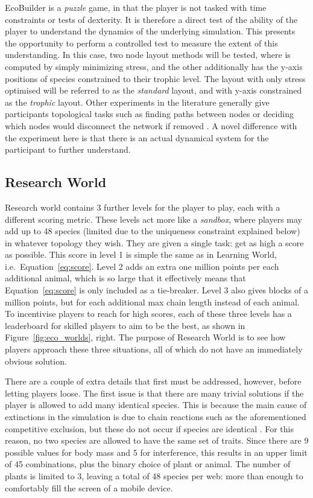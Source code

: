 EcoBuilder is a \emph{puzzle} game, in that the player is not tasked with time constraints or tests of dexterity. It is therefore a direct test of the ability of the player to understand the dynamics of the underlying simulation.
This presents the opportunity to perform a controlled test to measure the extent of this understanding. In this case, two node layout methods will be tested, where is computed by simply minimizing stress, and the other additionally has the y-axis positions of species constrained to their trophic level. The layout with only stress optimised will be referred to as the \emph{standard} layout, and with y-axis constrained as the \emph{trophic} layout.
Other experiments in the literature generally give participants topological tasks such as finding paths between nodes \cite{Bach2017, Okoe2018} or deciding which nodes would disconnect the network if removed \cite{Purchase1997}. A novel difference with the experiment here is that there is an actual dynamical system for the participant to further understand.

\subsection{Research World}
\label{sec:research_world}
Research world contains 3 further levels for the player to play, each with a different scoring metric. These levels act more like a \emph{sandbox}, where players may add up to 48 species (limited due to the uniqueness constraint explained below) in whatever topology they wish.
They are given a single task: get as high a score as possible. This score in level 1 is simple the same as in Learning World, i.e.\ Equation~\ref{eq:score}. Level 2 adds an extra one million points per each additional animal, which is so large that it effectively means that Equation~\ref{eq:score} is only included as a tie-breaker. 
Level 3 also gives blocks of a million points, but for each additional max chain length instead of each animal.
To incentivise players to reach for high scores, each of these three levels has a leaderboard for skilled players to aim to be the best, as shown in Figure~\ref{fig:eco_worlds}, right.
The purpose of Research World is to see how players approach these three situations, all of which do not have an immediately obvious solution.

There are a couple of extra details that first must be addressed, however, before letting players loose. The first issue is that there are many trivial solutions if the player is allowed to add many identical species. This is because the main cause of extinctions in the simulation is due to chain reactions such as the aforementioned competitive exclusion, but these do not occur if species are identical \cite{Armstrong1980}. For this reason, no two species are allowed to have the same set of traits. Since there are 9 possible values for body mass and 5 for interference, this results in an upper limit of 45 combinations, plus the binary choice of plant or animal. The number of plants is limited to 3, leaving a total of 48 species per web: more than enough to comfortably fill the screen of a mobile device.

